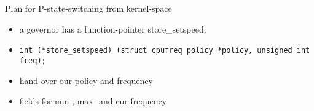 \begin{frame}{Plan for P-state-switching from kernel-space}
    \begin{itemize}
		\item a governor has a function-pointer store\_setspeed:
		\item \lstinline$int (*store_setspeed) (struct cpufreq policy *policy, unsigned int freq);$
		\item hand over our policy and frequency
		\item fields for min-, max- and cur frequency
    \end{itemize}
\end{frame}
